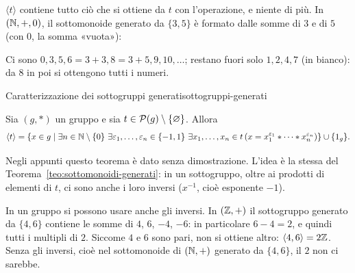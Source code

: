\begin{spiegazione}
    $\langle t \rangle$ contiene tutto ciò che si ottiene da $t$ con l'operazione, e niente di più. In $(\mathbb{N}, +, 0)$, il sottomonoide generato da $\{3, 5\}$ è formato dalle somme
    di $3$ e di $5$ (con $0$, la somma «vuota»):
    \begin{center}
    \end{center}
    Ci sono $0, 3, 5, 6 = 3 + 3, 8 = 3 + 5, 9, 10, \dots$; restano fuori solo $1, 2, 4, 7$ (in bianco): da $8$ in poi si ottengono tutti i numeri.
\end{spiegazione}


\begin{concetto}
\begin{Teorema}{Caratterizzazione dei sottogruppi generati}{sottogruppi-generati}
    \begin{prerequisiti}
    \end{prerequisiti}
    Sia $(g, *)$ un gruppo e sia $t \in \mathcal{P}(g) \setminus \{\varnothing\}$. Allora
    \[ \langle t \rangle = \{x \in g \mid \exists n \in \mathbb{N} \setminus \{0\}\ \exists \varepsilon_1, \dots, \varepsilon_n \in \{-1, 1\}\ \exists x_1, \dots, x_n \in t\,(x = x_1^{\varepsilon_1} * \dots * x_n^{\varepsilon_n})\} \cup \{1_g\}. \]
\end{Teorema}
\begin{dimostrazione}[Nota]
    Negli appunti questo teorema è dato senza dimostrazione. L'idea è la stessa del Teorema~\ref{teo:sottomonoidi-generati}:
    in un sottogruppo, oltre ai prodotti di elementi di $t$, ci sono anche i loro inversi ($x^{-1}$, cioè esponente $-1$).
\end{dimostrazione}
\end{concetto}

\begin{spiegazione}
    In un gruppo si possono usare anche gli inversi. In $(\mathbb{Z}, +)$ il sottogruppo generato da $\{4, 6\}$ contiene le somme di $4$, $6$, $-4$, $-6$: in particolare
    $6 - 4 = 2$, e quindi tutti i multipli di $2$. Siccome $4$ e $6$ sono pari, non si ottiene altro: $\langle 4, 6 \rangle = 2\mathbb{Z}$. Senza gli inversi, cioè nel sottomonoide
    di $(\mathbb{N}, +)$ generato da $\{4, 6\}$, il $2$ non ci sarebbe.
\end{spiegazione}


